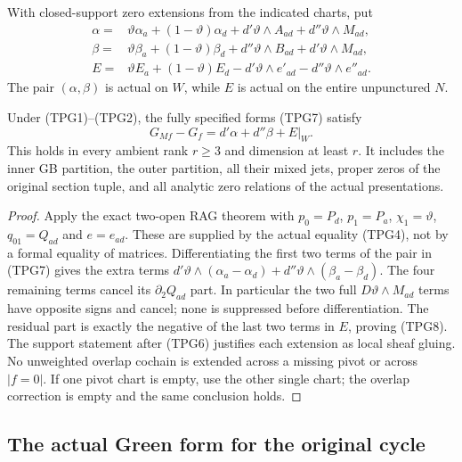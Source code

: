 With closed-support zero extensions from the indicated charts,
put
\[
 \begin{split}
 \alpha={}&\vartheta\alpha_a+(1-\vartheta)\alpha_d
             +d'\vartheta\wedge A_{ad}+d''\vartheta\wedge M_{ad},\\
 \beta={}&\vartheta\beta_a+(1-\vartheta)\beta_d
             +d''\vartheta\wedge B_{ad}+d'\vartheta\wedge M_{ad},\\
 E={}&\vartheta E_a+(1-\vartheta)E_d
             -d'\vartheta\wedge e'_{ad}
             -d''\vartheta\wedge e''_{ad}.
 \end{split}
 \tag{TPG7}
\]
The pair $(\alpha,\beta)$ is actual on $W$, while $E$ is actual
on the entire unpunctured $N$.

\begin{theorem}
Under (TPG1)--(TPG2), the fully specified forms (TPG7) satisfy
\[
                   G_{Mf}-G_f=d'\alpha+d''\beta+E|_W.
 \tag{TPG8}
\]
This holds in every ambient rank $r\ge3$ and dimension at least
$r$.  It includes the inner GB partition, the outer partition,
all their mixed jets, proper zeros of the original section tuple,
and all analytic zero relations of the actual presentations.
\end{theorem}

\begin{proof}
Apply the exact two-open RAG theorem with $p_0=P_d$, $p_1=P_a$,
$\chi_1=\vartheta$, $q_{01}=Q_{ad}$ and $e=e_{ad}$.
These are supplied by the actual equality (TPG4), not by a
formal equality of matrices.  Differentiating the first two
terms of the pair in (TPG7) gives the extra terms
$d'\vartheta\wedge(\alpha_a-\alpha_d)+
d''\vartheta\wedge(\beta_a-\beta_d)$.
The four remaining terms cancel its $\partial_2Q_{ad}$ part.
In particular the two full $D\vartheta\wedge M_{ad}$ terms
have opposite signs and cancel; none is suppressed before
differentiation.  The residual part is exactly the negative
of the last two terms in $E$, proving (TPG8).
The support statement after (TPG6) justifies each extension
as local sheaf gluing.  No unweighted overlap cochain is
extended across a missing pivot or across $|f=0|$.
If one pivot chart is empty, use the other single chart;
the overlap correction is empty and the same conclusion holds.
\end{proof}

\subsection{The actual Green form for the original cycle}

